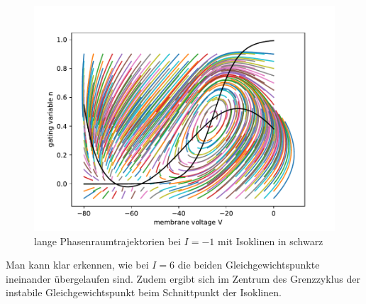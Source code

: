 \documentclass[12pt,a4paper]{article}
\begin{document}
\begin{figure}[H]
	\centering
	\includegraphics[scale=0.9]{phaseliness-1wn.pdf} 
	\caption{lange Phasenraumtrajektorien bei $I=-1$ mit Isoklinen in schwarz}
	\label{prls}
\end{figure} 
Man kann klar erkennen, wie bei $I=6$ die beiden Gleichgewichtspunkte ineinander übergelaufen sind. Zudem ergibt sich im Zentrum des Grenzzyklus der instabile Gleichgewichtspunkt beim Schnittpunkt der Isoklinen.
\end{document}
